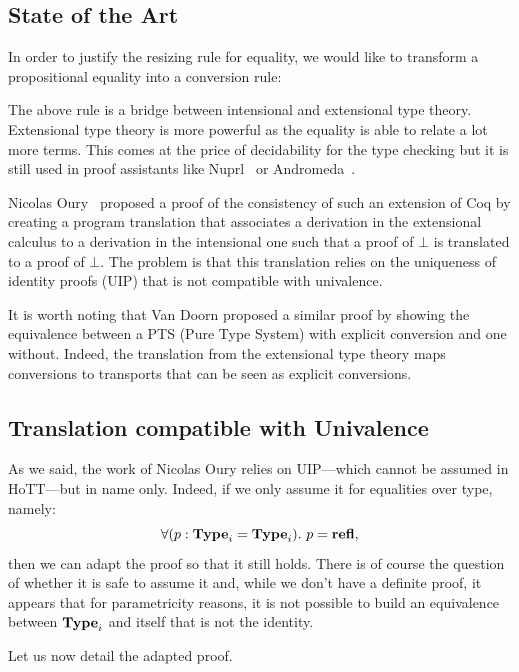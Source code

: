 \documentclass[11pt]{article}
\theoremstyle{plain}
\theoremstyle{remark}
\begin{document}
\subsection{State of the Art}

In order to justify the resizing rule for equality, we would like to transform
a propositional equality into a conversion rule:

\begin{mathc}
\end{mathc}
%
The above rule is a bridge between intensional and extensional type theory.
Extensional type theory is more powerful as the equality is able to relate a lot
more terms. This comes at the price of decidability for the type checking but it
is still used in proof assistants like Nuprl~\cite{constableimplementing} or
Andromeda~\cite{andromeda}.

Nicolas Oury~\cite{oury2005extensionality} proposed a proof of the consistency
of such an extension of Coq by creating a program translation that associates a
derivation in the extensional calculus to a derivation in the intensional one
such that a proof of $\bot$ is translated to a proof of $\bot$.
The problem is that this translation relies on the uniqueness of identity
proofs (UIP) that is not compatible with univalence.

It is worth noting that Van Doorn \etal \cite{van2013explicit} proposed a
similar proof by showing the equivalence between a PTS (Pure Type System) with
explicit conversion and one without. Indeed, the translation from the
extensional type theory maps conversions to transports that can be seen as
explicit conversions.

\subsection{Translation compatible with Univalence}

As we said, the work of Nicolas Oury relies on UIP---which cannot be assumed in
HoTT---but in name only. Indeed, if we only assume it for equalities over
type, namely:
\[ \forall (p : \operatorname{\mathbf{Type}}_i = \operatorname{\mathbf{Type}}_i).\ p = \operatorname{\mathbf{refl}}, \]
then we can adapt the proof so that it still holds.
There is of course the question of whether it is safe to assume it and, while
we don't have a definite proof, it appears that for parametricity reasons,
it is not possible to build an equivalence between $\operatorname{\mathbf{Type}}_i$ and itself that
is not the identity.

Let us now detail the adapted proof.
\end{document}

